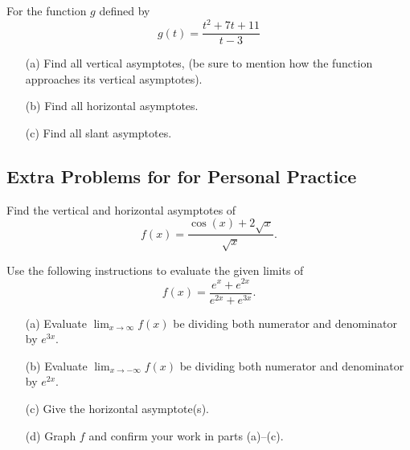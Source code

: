 \documentclass[handout,nooutcomes]{ximera}
\begin{document}
\begin{problem}
  \label{problem:find-all-asymptotes}
  For the function $g$ defined by 
  \[
    g(t) = \frac{t^2 + 7t + 11}{t-3}
  \]
  \begin{itemize}
    \item[(a)]
      Find all vertical asymptotes, (be sure to mention how the function approaches its vertical asymptotes).

    \item[(b)]
      Find all horizontal asymptotes.

    \item[(c)]
      Find all slant asymptotes.
  \end{itemize}
\end{problem}

\subsection*{Extra Problems for for Personal Practice}
\label{section:extra-problems}
\begin{problem}
  \label{problem:briggs-2-5-69}
  Find the vertical and horizontal asymptotes of
  \[
    f(x) = \frac{\cos(x) + 2\sqrt{x}}{\sqrt{x}}.
  \]
\end{problem}

\begin{problem}
  \label{problem:briggs-2-5-82}
  Use the following instructions to evaluate the given limits of
  \[
    f(x) = \frac{e^x + e^{2x}}{e^{2x} + e^{3x}}.
  \]
  \begin{itemize}
    \item[(a)]
      Evaluate $\displaystyle \lim_{x \to \infty} f(x)$ be dividing both numerator and denominator by $e^{3x}$.

    \item[(b)]
      Evaluate $\displaystyle \lim_{x \to -\infty} f(x)$ be dividing both numerator and denominator by $e^{2x}$.

    \item[(c)]
      Give the horizontal asymptote(s).

    \item[(d)]
      Graph $f$ and confirm your work in parts (a)--(c).
  \end{itemize}
\end{problem}
\end{document}
